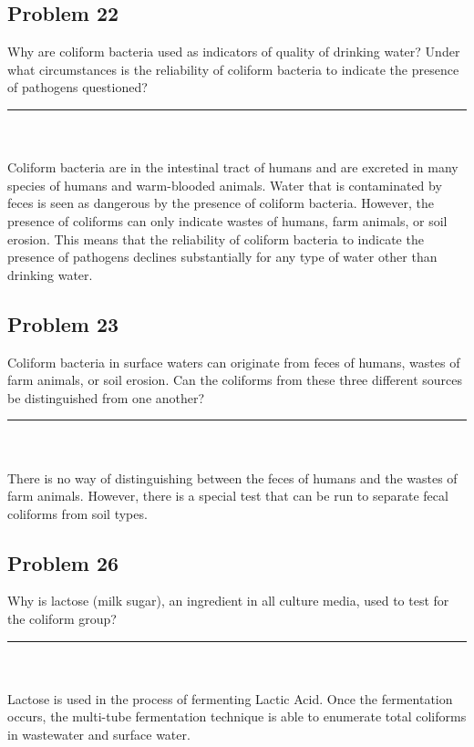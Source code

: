 \subsection*{Problem 22}
Why are coliform bacteria used as indicators of quality of drinking water? Under what circumstances is the reliability of coliform bacteria to indicate the presence of pathogens questioned?\\
\rule{5cm}{1pt}
\\\\Coliform bacteria are in the intestinal tract of humans and are excreted in many species of humans and warm-blooded animals. Water that is contaminated by feces is seen as dangerous by the presence of coliform bacteria. However, the presence of coliforms can only indicate wastes of humans, farm animals, or soil erosion. This means that the reliability of coliform bacteria to indicate the presence of pathogens declines substantially for any type of water other than drinking water.
\subsection*{Problem 23}
Coliform bacteria in surface waters can originate from feces of humans, wastes of farm animals, or soil erosion. Can the coliforms from these three different sources be distinguished from one another?\\
\rule{5cm}{1pt}
\\\\There is no way of distinguishing between the feces of humans and the wastes of farm animals. However, there is a special test that can be run to separate fecal coliforms from soil types.
\subsection*{Problem 26}
Why is lactose (milk sugar), an ingredient in all culture media, used to test for the coliform group?\\
\rule{5cm}{1pt}
\\\\Lactose is used in the process of fermenting Lactic Acid. Once the fermentation occurs, the multi-tube fermentation technique is able to enumerate total coliforms in wastewater and surface water.